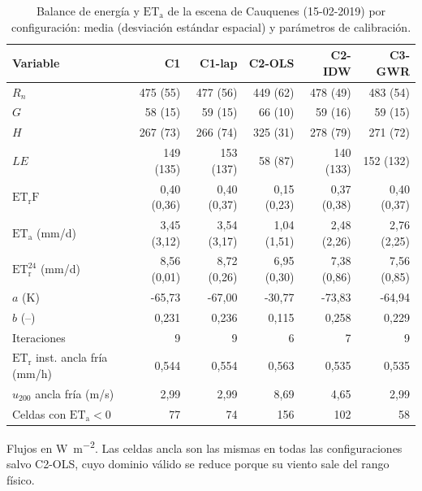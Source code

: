 \begin{table}[htbp]
\centering
\footnotesize
\caption{Balance de energía y $\mathrm{ET_a}$ de la escena de Cauquenes (15-02-2019) por configuración: media (desviación estándar espacial) y parámetros de calibración.}\label{tab:metric}
\begin{threeparttable}
\begin{tabular}{lrrrrr}
\toprule
Variable & C1 & C1-lap & C2-OLS & C2-IDW & C3-GWR \\
\midrule
$R_n$ & 475 (55) & 477 (56) & 449 (62) & 478 (49) & 483 (54) \\
$G$ & 58 (15) & 59 (15) & 66 (10) & 59 (16) & 59 (15) \\
$H$ & 267 (73) & 266 (74) & 325 (31) & 278 (79) & 271 (72) \\
$LE$ & 149 (135) & 153 (137) & 58 (87) & 140 (133) & 152 (132) \\
$\mathrm{ET_rF}$ & 0,40 (0,36) & 0,40 (0,37) & 0,15 (0,23) & 0,37 (0,38) & 0,40 (0,37) \\
$\mathrm{ET_a}$ (mm/d) & 3,45 (3,12) & 3,54 (3,17) & 1,04 (1,51) & 2,48 (2,26) & 2,76 (2,25) \\
$\mathrm{ET_r^{24}}$ (mm/d) & 8,56 (0,01) & 8,72 (0,26) & 6,95 (0,30) & 7,38 (0,86) & 7,56 (0,85) \\
\midrule
$a$ (K) & -65,73 & -67,00 & -30,77 & -73,83 & -64,94 \\
$b$ (--) & 0,231 & 0,236 & 0,115 & 0,258 & 0,229 \\
Iteraciones & 9 & 9 & 6 & 7 & 9 \\
$\mathrm{ET_r}$ inst. ancla fría (mm/h) & 0,544 & 0,554 & 0,563 & 0,535 & 0,535 \\
$u_{200}$ ancla fría (m/s) & 2,99 & 2,99 & 8,69 & 4,65 & 2,99 \\
Celdas con $\mathrm{ET_a} < 0$ & 77 & 74 & 156 & 102 & 58 \\
\bottomrule
\end{tabular}
\begin{tablenotes}\footnotesize
\item Flujos en \si{\watt\per\square\metre}. Las celdas ancla son las mismas en todas las configuraciones salvo C2-OLS, cuyo dominio válido se reduce porque su viento sale del rango físico.
\end{tablenotes}
\end{threeparttable}
\end{table}
